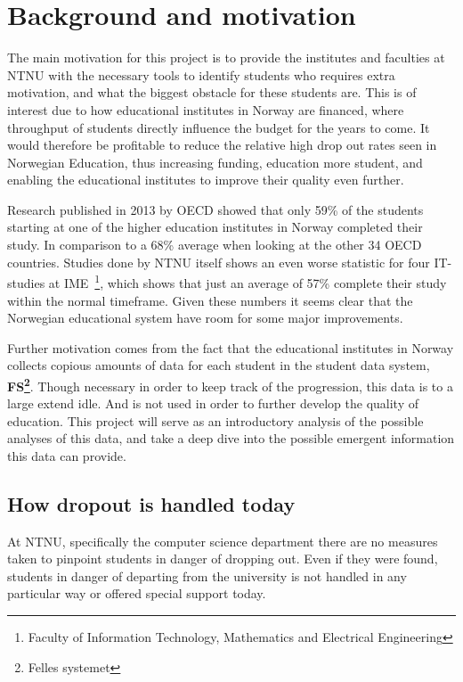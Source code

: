\section{Background and motivation}
	The main motivation for this project is to provide the institutes and faculties at NTNU 
	with the necessary tools to identify students who requires extra motivation, and what the biggest obstacle for these students are.
	This is of interest due to how educational institutes in Norway are financed, 
	where throughput of students directly influence the budget for the years to come\cite{finansiering}. 
	It would therefore be profitable to reduce the relative high drop out rates seen in Norwegian Education, 
	thus increasing funding, education more student, and enabling the educational institutes to improve their quality even further.
	
	\bigskip\noindent
	Research published in 2013 by OECD showed that only 59\% of the students
	starting at one of the higher education institutes in Norway completed their study.
	In comparison to a 68\% average when looking at the other 34 OECD countries\cite{OECD2013}.
	Studies done by NTNU itself shows an even worse statistic for four IT-studies at IME~\footnote{Faculty of Information Technology, Mathematics and Electrical Engineering},	which shows that just an average of 57\%\cite{ntnu:dropout} complete their study within the normal timeframe.
	Given these numbers it seems clear that the Norwegian educational system have room for some major improvements. 

	\bigskip\noindent
	Further motivation comes from the fact that the educational institutes in Norway collects
	copious amounts of data for each student in the student data system, \textbf{FS\footnote{Felles systemet}}. 
	Though necessary in order to keep track of the progression, 
	this data is to a large extend idle. And is not used in order to further develop the quality of education. 
	This project will serve as an introductory analysis of the possible analyses of this data, 
	and take a deep dive into the possible emergent information this data can provide. 
	
\subsection{How dropout is handled today}
At NTNU, specifically the computer science department there are no measures taken to pinpoint students in danger of dropping out.
Even if they were found, students in danger of departing from the university is not handled in any particular way or offered special support today.
